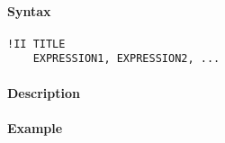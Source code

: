 


	\paragraph{Syntax}

\begin{verbatim}
!II TITLE
    EXPRESSION1, EXPRESSION2, ...
\end{verbatim}

\paragraph{Description}

\paragraph{Example}


